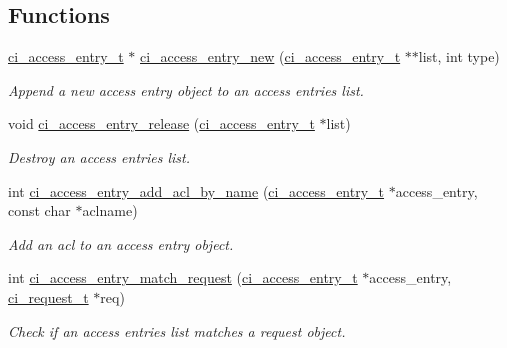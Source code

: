 \subsection*{Functions}
\begin{DoxyCompactItemize}
\item 
\hyperlink{group__ACL_ga569aa156e347e7912a7bf8610c1f6ca3}{ci\_\-access\_\-entry\_\-t} $\ast$ \hyperlink{group__ACL_ga8b59d23a19247a61b2df28fc59105857}{ci\_\-access\_\-entry\_\-new} (\hyperlink{group__ACL_ga569aa156e347e7912a7bf8610c1f6ca3}{ci\_\-access\_\-entry\_\-t} $\ast$$\ast$list, int type)
\begin{DoxyCompactList}\small\item\em Append a new access entry object to an access entries list. \item\end{DoxyCompactList}\item 
void \hyperlink{group__ACL_ga46037760b7492e44238569bfce1174d8}{ci\_\-access\_\-entry\_\-release} (\hyperlink{group__ACL_ga569aa156e347e7912a7bf8610c1f6ca3}{ci\_\-access\_\-entry\_\-t} $\ast$list)
\begin{DoxyCompactList}\small\item\em Destroy an access entries list. \item\end{DoxyCompactList}\item 
int \hyperlink{group__ACL_ga9ed5d0d0d59486ddb28453c9fcda9fc9}{ci\_\-access\_\-entry\_\-add\_\-acl\_\-by\_\-name} (\hyperlink{group__ACL_ga569aa156e347e7912a7bf8610c1f6ca3}{ci\_\-access\_\-entry\_\-t} $\ast$access\_\-entry, const char $\ast$aclname)
\begin{DoxyCompactList}\small\item\em Add an acl to an access entry object. \item\end{DoxyCompactList}\item 
int \hyperlink{group__ACL_ga8e5833ad80ae63dc66bff07f398f0d89}{ci\_\-access\_\-entry\_\-match\_\-request} (\hyperlink{group__ACL_ga569aa156e347e7912a7bf8610c1f6ca3}{ci\_\-access\_\-entry\_\-t} $\ast$access\_\-entry, \hyperlink{group__REQUEST_ga27da5c4ae491f527ce36901c2e78ea04}{ci\_\-request\_\-t} $\ast$req)
\begin{DoxyCompactList}\small\item\em Check if an access entries list matches a request object. \item\end{DoxyCompactList}\item 
$$
\end{DoxyCompactItemize}
